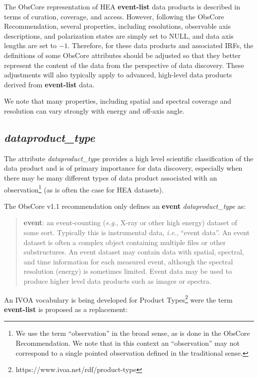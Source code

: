 \documentclass[11pt,a4paper]{ivoa}
\begin{document}
The ObsCore representation of \gls{HEA} \textbf{event-list} data products is described in terms of curation, coverage, and access.  However, following the ObsCore Recommendation, several properties, including resolutions, observable axis descriptions, and polarization states are simply set to NULL, and data axis lengths are set to $-1$.  Therefore, for these data products and associated IRFs, the definitions of some ObsCore attributes should be adjusted so that they better represent the content of the data from the perspective of data discovery. These adjustments will also typically apply to advanced, high-level data products derived from \textbf{event-list} data.

We note that many properties, including spatial and spectral coverage and resolution can vary strongly with energy and off-axis angle.

\subsection{{\em dataproduct\_type}}
\label{sec:dataproduct_type}

The attribute {\em dataproduct\_type\/} provides a high level scientific classification of the data product and is of primary importance for data discovery, especially when there may be many different types of data product associated with an observation\footnote{We use the term ``observation'' in the broad sense, as is done in the ObsCore Recommendation. We note that in this context an ``observation'' may not correspond to a single pointed observation defined in the traditional sense.} (as is often the case for \gls{HEA} datasets).

The ObsCore v1.1 recommendation \citep{2017ivoa.spec.0509L} only defines an {\bf event} {\em dataproduct\_type} as:

\begin{quote}
{\bf event}: an event-counting ({\em e.g.\/}, X-ray or other high energy) dataset of some sort. Typically this is instrumental data, {\em i.e.\/}, ``event data''.  An event dataset is often a complex object containing multiple files or other substructures. An event dataset may contain data with spatial, spectral, and time information for each measured event, although the spectral resolution (energy) is sometimes limited. Event data may be used to produce higher level data products such as images or spectra.
\end{quote}

An \gls{IVOA} vocabulary is being developed for Product Types\footnote{https://www.ivoa.net/rdf/product-type} were the term \textbf{event-list} is proposed as a replacement:
\end{document}
